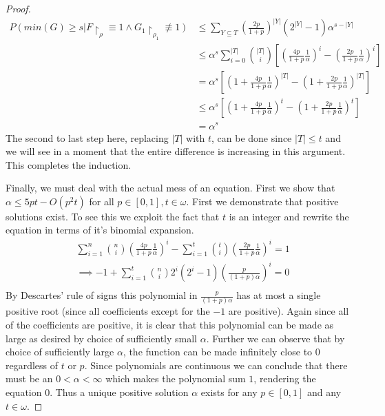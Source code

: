 \documentclass{article}
\theoremstyle{definition}
\theoremstyle{plain}
\theoremstyle{theorem}
\begin{document}
\begin{proof}
\begin{align*}
	P(min(G) \geq s | F \restriction_{\rho} \equiv 1 \wedge G_1 \restriction_{\rho_1} \not\equiv 1) &\leq \sum_{Y \subseteq T} \left( \frac{2p}{1+p} \right)^{|Y|}(2^{|Y|}-1)\alpha^{s-|Y|} \\
	&\leq \alpha^s\sum_{i=0}^{|T|} {|T| \choose i}\left[ \left( \frac{4p}{1+p}\frac{1}{\alpha} \right)^i - \left( \frac{2p}{1+p}\frac{1}{\alpha} \right)^i \right] \\
	&= \alpha^s\left[ \left(1+\frac{4p}{1+p}\frac{1}{\alpha} \right)^{|T|} - \left(1+ \frac{2p}{1+p}\frac{1}{\alpha} \right)^{|T|} \right] \\
	&\leq \alpha^s \left[ \left( 1+\frac{4p}{1+p}\frac{1}{\alpha} \right)^t - \left(1+ \frac{2p}{1+p}\frac{1}{\alpha} \right)^t \right] \\
	&= \alpha^s
\end{align*}
The second to last step here, replacing $|T|$ with $t$, can be done since $|T| \leq t$ and we will see in a moment that the entire difference is increasing in this argument. This completes the induction. \par 
Finally, we must deal with the actual mess of an equation. First we show that $\alpha \leq 5pt - O(p^2t)$ for all $p \in [0,1],t \in \omega$. First we demonstrate that positive solutions exist. To see this we exploit the fact that $t$ is an integer and rewrite the equation in terms of it's binomial expansion. 
\begin{align*}
	& \sum_{i=1}^n {n \choose i} \left( \frac{4p}{1+p}\frac{1}{\alpha} \right)^i - \sum_{i=1}^t {t \choose i} \left( \frac{2p}{1+p}\frac{1}{\alpha} \right)^i = 1 \\
	&\implies -1 + \sum_{i=1}^t {n \choose i} 2^i(2^i-1) \left( \frac{p}{(1+p)\alpha} \right)^i  = 0  \\
\end{align*}
By Descartes' rule of signs this polynomial in $\frac{p}{(1+p)\alpha}$ has at most a single positive root (since all coefficients except for the $-1$ are positive). Again since all of the coefficients are positive, it is clear that this polynomial can be made as large as desired by choice of sufficiently small $\alpha$. Further we can observe that by choice of sufficiently large $\alpha$, the function can be made infinitely close to $0$ regardless of $t$ or $p$. Since polynomials are continuous we can conclude that there must be an $0 < \alpha < \infty$ which makes the polynomial sum $1$, rendering the equation $0$. Thus a unique positive solution $\alpha$ exists for any $p \in [0,1]$ and any $t \in \omega$. 

\end{proof}
\end{document}
